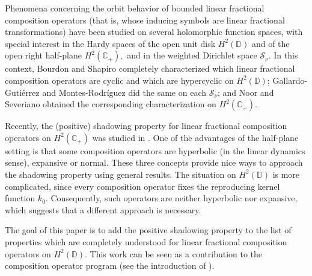 \documentclass[11pt]{amsart}
\theoremstyle{plain}
\theoremstyle{remark}
\theoremstyle{plain}
\begin{document}
Phenomena concerning the orbit behavior of bounded linear fractional composition operators (that is, whose inducing symbols are linear fractional transformations) have been studied on several holomorphic function spaces, with special interest in the Hardy spaces of the open unit disk $H^2(\mathbb{D})$ and of the open right half-plane $H^2(\mathbb{C}_+),$ and in the weighted Dirichlet space $\mathcal{S}_{\nu}$. In this context, Bourdon and Shapiro \cite{Shapiro_Bourdon_Livro_Ciclicidade} completely characterized which linear fractional composition operators are cyclic and which are hypercyclic on $H^2(\mathbb{D})$; Gallardo-Gutiérrez and Montes-Rodríguez \cite{Eva-Afonso} did the same on each $\mathcal{S}_{\nu}$; and Noor and Severiano \cite{Noor-Severiano} obtained the corresponding characterization on $H^2(\mathbb{C}_+)$.

Recently, the (positive) shadowing property for linear fractional composition operators on $H^2(\mathbb{C}_+)$ was studied in \cite{Carlos_Javier_ShadowingHalfPlane}. One of the advantages of the half-plane setting is that some composition operators are hyperbolic (in the linear dynamics sense), expansive or normal. These three concepts provide nice ways to approach the shadowing property using general results. The situation on $H^2(\mathbb{D})$ is more complicated, since every composition operator fixes the reproducing kernel function $k_0$. Consequently, such operators are neither hyperbolic nor expansive, which suggests that a different approach is necessary.

 The goal of this paper is to add the positive shadowing property to the list of properties which are completely understood for linear fractional composition operators on $H^2(\mathbb{D}).$ This work can be seen as a contribution to the composition operator program (see the introduction of \cite{Shapiro_Bourdon_Livro_Ciclicidade}).
\end{document}
